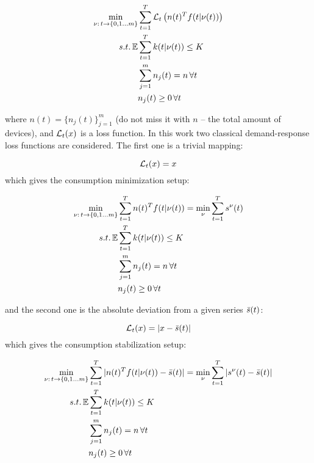 \begin{align*}
    \label{eq:linear_bandits_with_context_setup}
    \min_{\nu:\, t \to \{0, 1\dots m\} }& \sum_{t=1}^T{\cal L}_t\left(n(t)^Tf(t|\nu(t))\right)\\
     s.t. \operatorname{\mathbb{E}}&  \sum_{t=1}^T k(t|\nu(t)) \leq K \\
     & \sum_{j=1}^m n_j(t) = n\, \forall t\\
     & n_j(t) \geq 0\, \forall t
\end{align*}

where $n(t) = \{n_j(t)\}_{j=1}^m$ (do not miss it with $n$ -- the total amount of devices), and ${\cal L}_t(x)$ is a loss function. In this work two classical demand-response loss functions are considered. The first one is a trivial mapping:

\begin{equation}
    \label{eq:trivial_loss}
    {\cal L}_t(x) = x
\end{equation}
which gives the consumption minimization setup:

\begin{align}
    \label{eq:minimization_bandit_setup}
    \begin{split}    
    \min_{\nu:\, t \to \{0, 1\dots m\} }& \sum_{t=1}^Tn(t)^Tf(t|\nu(t)) = \min_{\nu} \sum_{t=1}^Ts^\nu(t)\\
     s.t. \operatorname{\mathbb{E}}& \sum_{t=1}^T k(t|\nu(t)) \leq K \\
     & \sum_{j=1}^m n_j(t) = n\, \forall t\\
     & n_j(t) \geq 0\, \forall t
     \end{split}
\end{align}

and the second one is the absolute deviation from a given series $\bar s(t)$:

\begin{equation}
    \label{eq:stabilization_loss}
    {\cal L}_t(x) = |x - \bar s(t)|
\end{equation}
which gives the consumption stabilization setup:

\begin{align}    
    \begin{split}
    \label{eq:stabilization_bandit_setup}
    \min_{\nu:\, t \to \{0, 1\dots m\} }& \sum_{t=1}^T|n(t)^Tf(t|\nu(t)) - \bar s(t)| = \min_{\nu } \sum_{t=1}^T|s^\nu(t) - \bar s(t)|\\
     s.t. \operatorname{\mathbb{E}}& \sum_{t=1}^T k(t|\nu(t)) \leq K \\
     & \sum_{j=1}^m n_j(t) = n\, \forall t \\
     & n_j(t) \geq 0\, \forall t
     \end{split}
\end{align}

